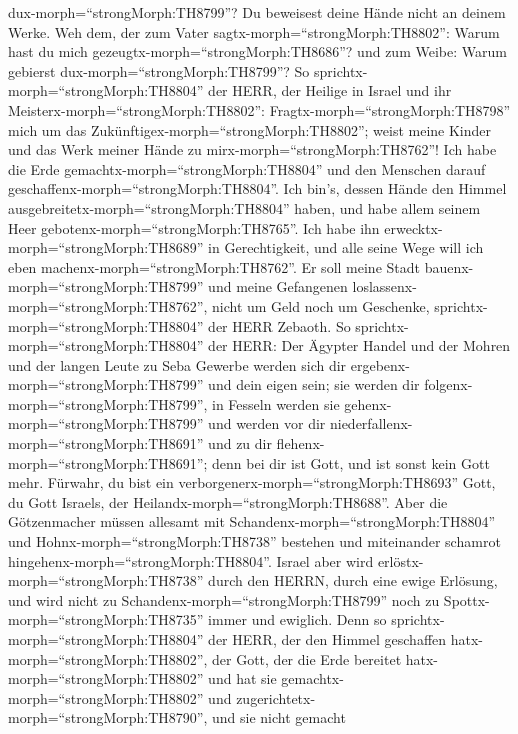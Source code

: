 dux-morph=``strongMorph:TH8799''? Du beweisest deine Hände nicht an
deinem Werke.  Weh dem, der zum Vater
sagtx-morph=``strongMorph:TH8802'': Warum hast du mich
gezeugtx-morph=``strongMorph:TH8686''? und zum Weibe: Warum gebierst
dux-morph=``strongMorph:TH8799''?  So
sprichtx-morph=``strongMorph:TH8804'' der HERR, der Heilige in Israel
und ihr Meisterx-morph=``strongMorph:TH8802'':
Fragtx-morph=``strongMorph:TH8798'' mich um das
Zukünftigex-morph=``strongMorph:TH8802''; weist meine Kinder und das
Werk meiner Hände zu mirx-morph=``strongMorph:TH8762''! 
Ich habe die Erde gemachtx-morph=``strongMorph:TH8804'' und den Menschen
darauf geschaffenx-morph=``strongMorph:TH8804''. Ich bin's, dessen Hände
den Himmel ausgebreitetx-morph=``strongMorph:TH8804'' haben, und habe
allem seinem Heer gebotenx-morph=``strongMorph:TH8765''. 
Ich habe ihn erwecktx-morph=``strongMorph:TH8689'' in Gerechtigkeit, und
alle seine Wege will ich eben machenx-morph=``strongMorph:TH8762''. Er
soll meine Stadt bauenx-morph=``strongMorph:TH8799'' und meine
Gefangenen loslassenx-morph=``strongMorph:TH8762'', nicht um Geld noch
um Geschenke, sprichtx-morph=``strongMorph:TH8804'' der HERR Zebaoth.
 So sprichtx-morph=``strongMorph:TH8804'' der HERR: Der
Ägypter Handel und der Mohren und der langen Leute zu Seba Gewerbe
werden sich dir ergebenx-morph=``strongMorph:TH8799'' und dein eigen
sein; sie werden dir folgenx-morph=``strongMorph:TH8799'', in Fesseln
werden sie gehenx-morph=``strongMorph:TH8799'' und werden vor dir
niederfallenx-morph=``strongMorph:TH8691'' und zu dir
flehenx-morph=``strongMorph:TH8691''; denn bei dir ist Gott, und ist
sonst kein Gott mehr.  Fürwahr, du bist ein
verborgenerx-morph=``strongMorph:TH8693'' Gott, du Gott Israels, der
Heilandx-morph=``strongMorph:TH8688''.  Aber die
Götzenmacher müssen allesamt mit Schandenx-morph=``strongMorph:TH8804''
und Hohnx-morph=``strongMorph:TH8738'' bestehen und miteinander schamrot
hingehenx-morph=``strongMorph:TH8804''.  Israel aber wird
erlöstx-morph=``strongMorph:TH8738'' durch den HERRN, durch eine ewige
Erlösung, und wird nicht zu Schandenx-morph=``strongMorph:TH8799'' noch
zu Spottx-morph=``strongMorph:TH8735'' immer und ewiglich. 
Denn so sprichtx-morph=``strongMorph:TH8804'' der HERR, der den Himmel
geschaffen hatx-morph=``strongMorph:TH8802'', der Gott, der die Erde
bereitet hatx-morph=``strongMorph:TH8802'' und hat sie
gemachtx-morph=``strongMorph:TH8802'' und
zugerichtetx-morph=``strongMorph:TH8790'', und sie nicht gemacht
